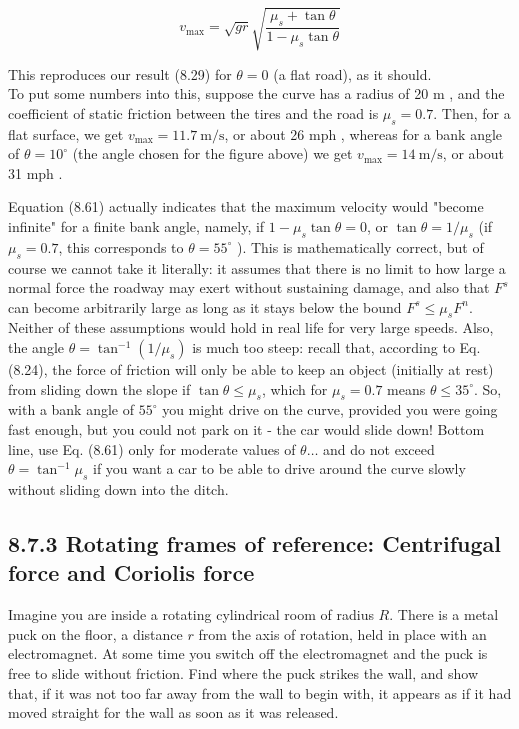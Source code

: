 \documentclass[10pt]{article}
\begin{document}
\begin{equation*}
v_{\max }=\sqrt{g r} \sqrt{\frac{\mu_{s}+\tan \theta}{1-\mu_{s} \tan \theta}} \tag{8.61}
\end{equation*}


This reproduces our result (8.29) for $\theta=0$ (a flat road), as it should.\\
To put some numbers into this, suppose the curve has a radius of 20 m , and the coefficient of static friction between the tires and the road is $\mu_{s}=0.7$. Then, for a flat surface, we get $v_{\max }=11.7 \mathrm{~m} / \mathrm{s}$, or about 26 mph , whereas for a bank angle of $\theta=10^{\circ}$ (the angle chosen for the figure above) we get $v_{\max }=14 \mathrm{~m} / \mathrm{s}$, or about 31 mph .

Equation (8.61) actually indicates that the maximum velocity would "become infinite" for a finite bank angle, namely, if $1-\mu_{s} \tan \theta=0$, or $\tan \theta=1 / \mu_{s}$ (if $\mu_{s}=0.7$, this corresponds to $\theta=55^{\circ}$ ). This is mathematically correct, but of course we cannot take it literally: it assumes that there is no limit to how large a normal force the roadway may exert without sustaining damage, and also that $F^{s}$ can become arbitrarily large as long as it stays below the bound $F^{s} \leq \mu_{s} F^{n}$. Neither of these assumptions would hold in real life for very large speeds. Also, the angle $\theta=\tan ^{-1}\left(1 / \mu_{s}\right)$ is much too steep: recall that, according to Eq. (8.24), the force of friction will only be able to keep an object (initially at rest) from sliding down the slope if $\tan \theta \leq \mu_{s}$, which for $\mu_{s}=0.7$ means $\theta \leq 35^{\circ}$. So, with a bank angle of $55^{\circ}$ you might drive on the curve, provided you were going fast enough, but you could not park on it - the car would slide down! Bottom line, use Eq. (8.61) only for moderate values of $\theta \ldots$ and do not exceed $\theta=\tan ^{-1} \mu_{s}$ if you want a car to be able to drive around the curve slowly without sliding down into the ditch.

\subsection*{8.7.3 Rotating frames of reference: Centrifugal force and Coriolis force}
Imagine you are inside a rotating cylindrical room of radius $R$. There is a metal puck on the floor, a distance $r$ from the axis of rotation, held in place with an electromagnet. At some time you switch off the electromagnet and the puck is free to slide without friction. Find where the puck strikes the wall, and show that, if it was not too far away from the wall to begin with, it appears as if it had moved straight for the wall as soon as it was released.
\end{document}
